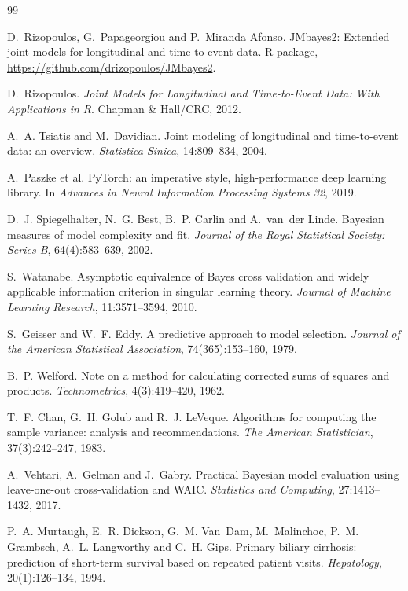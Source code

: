 \documentclass[11pt]{article}
\begin{document}
\begin{thebibliography}{99}

D.~Rizopoulos, G.~Papageorgiou and P.~Miranda Afonso.
\newblock JMbayes2: Extended joint models for longitudinal and time-to-event data.
\newblock R package, \url{https://github.com/drizopoulos/JMbayes2}.

D.~Rizopoulos.
\newblock \emph{Joint Models for Longitudinal and Time-to-Event Data: With Applications
in R}.
\newblock Chapman \& Hall/CRC, 2012.

A.~A. Tsiatis and M.~Davidian.
\newblock Joint modeling of longitudinal and time-to-event data: an overview.
\newblock \emph{Statistica Sinica}, 14:809--834, 2004.

A.~Paszke et al.
\newblock PyTorch: an imperative style, high-performance deep learning library.
\newblock In \emph{Advances in Neural Information Processing Systems 32}, 2019.

D.~J. Spiegelhalter, N.~G. Best, B.~P. Carlin and A.~van~der Linde.
\newblock Bayesian measures of model complexity and fit.
\newblock \emph{Journal of the Royal Statistical Society: Series B}, 64(4):583--639, 2002.

S.~Watanabe.
\newblock Asymptotic equivalence of Bayes cross validation and widely applicable
information criterion in singular learning theory.
\newblock \emph{Journal of Machine Learning Research}, 11:3571--3594, 2010.

S.~Geisser and W.~F. Eddy.
\newblock A predictive approach to model selection.
\newblock \emph{Journal of the American Statistical Association}, 74(365):153--160, 1979.

B.~P. Welford.
\newblock Note on a method for calculating corrected sums of squares and products.
\newblock \emph{Technometrics}, 4(3):419--420, 1962.

T.~F. Chan, G.~H. Golub and R.~J. LeVeque.
\newblock Algorithms for computing the sample variance: analysis and recommendations.
\newblock \emph{The American Statistician}, 37(3):242--247, 1983.

A.~Vehtari, A.~Gelman and J.~Gabry.
\newblock Practical Bayesian model evaluation using leave-one-out cross-validation and
WAIC.
\newblock \emph{Statistics and Computing}, 27:1413--1432, 2017.

P.~A. Murtaugh, E.~R. Dickson, G.~M. Van~Dam, M.~Malinchoc, P.~M. Grambsch, A.~L.
Langworthy and C.~H. Gips.
\newblock Primary biliary cirrhosis: prediction of short-term survival based on repeated
patient visits.
\newblock \emph{Hepatology}, 20(1):126--134, 1994.


\end{thebibliography}
\end{document}
